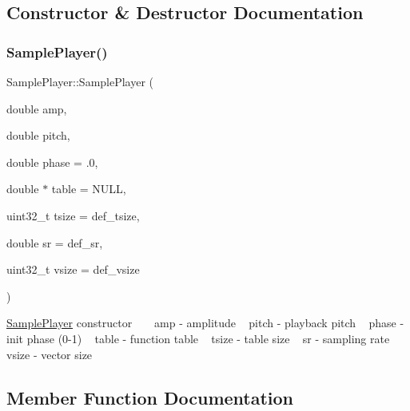 \subsection{Constructor \& Destructor Documentation}
\mbox{\label{class_sample_player_aa7ce31700ed3ebebfb0604e642ca7ea8}} 
\subsubsection{\texorpdfstring{Sample\+Player()}{SamplePlayer()}}
{\footnotesize\ttfamily Sample\+Player\+::\+Sample\+Player (\begin{DoxyParamCaption}\item[{double}]{amp,  }\item[{double}]{pitch,  }\item[{double}]{phase = {\ttfamily .0},  }\item[{double $\ast$}]{table = {\ttfamily NULL},  }\item[{uint32\+\_\+t}]{tsize = {\ttfamily def\+\_\+tsize},  }\item[{double}]{sr = {\ttfamily def\+\_\+sr},  }\item[{uint32\+\_\+t}]{vsize = {\ttfamily def\+\_\+vsize} }\end{DoxyParamCaption})\hspace{0.3cm}{\ttfamily [inline]}}

\hyperlink{class_sample_player}{Sample\+Player} constructor ~\newline
~\newline
amp -\/ amplitude ~\newline
pitch -\/ playback pitch ~\newline
phase -\/ init phase (0-\/1) ~\newline
 table -\/ function table ~\newline
tsize -\/ table size ~\newline
sr -\/ sampling rate ~\newline
vsize -\/ vector size ~\newline


\subsection{Member Function Documentation}
\mbox{\label{class_sample_player_a263ee55c5d334486bc57956458a64713}} 
